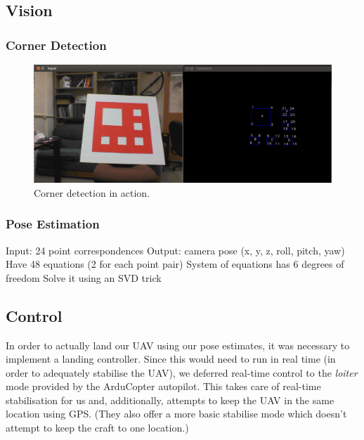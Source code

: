 \documentclass[10pt]{scrartcl} %
\begin{document}



\subsection{Vision}

\subsubsection{Corner Detection}

\begin{figure}[h]
    \centering
    \includegraphics[width=\textwidth]{images/corners.png}
    \caption{Corner detection in action.}
    \label{fig:corners}
\end{figure}

\subsubsection{Pose Estimation}

Input: 24 point correspondences
Output: camera pose (x, y, z, roll, pitch, yaw)
Have 48 equations (2 for each point pair)
System of equations has 6 degrees of freedom
Solve it using an SVD trick


\subsection{Control}
In order to actually land our UAV using our pose estimates, it was necessary to implement a landing controller. Since this would need to run in real time (in order to adequately stabilise the UAV), we deferred real-time control to the \textit{loiter} mode provided by the ArduCopter autopilot. This takes care of real-time stabilisation for us and, additionally, attempts to keep the UAV in the same location using GPS. (They also offer a more basic stabilise mode which doesn't attempt to keep the craft to one location.)
\end{document}
